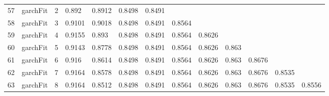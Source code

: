 \documentclass[10pt,a4paper]{article}
\begin{document}
\begin{table}[ht]
\begin{tabular}{rlrllllllllll}
  57 & garchFit &     2 & 0.892 & 0.8912 & 0.8498 & 0.8491 &  &  &  &  &  &  \\ 
  58 & garchFit &     3 & 0.9101 & 0.9018 & 0.8498 & 0.8491 & 0.8564 &  &  &  &  &  \\ 
  59 & garchFit &     4 & 0.9155 & 0.893 & 0.8498 & 0.8491 & 0.8564 & 0.8626 &  &  &  &  \\ 
  60 & garchFit &     5 & 0.9143 & 0.8778 & 0.8498 & 0.8491 & 0.8564 & 0.8626 & 0.863 &  &  &  \\ 
  61 & garchFit &     6 & 0.916 & 0.8614 & 0.8498 & 0.8491 & 0.8564 & 0.8626 & 0.863 & 0.8676 &  &  \\ 
  62 & garchFit &     7 & 0.9164 & 0.8578 & 0.8498 & 0.8491 & 0.8564 & 0.8626 & 0.863 & 0.8676 & 0.8535 &  \\ 
  63 & garchFit &     8 & 0.9164 & 0.8512 & 0.8498 & 0.8491 & 0.8564 & 0.8626 & 0.863 & 0.8676 & 0.8535 & 0.8556 \\ 
   \hline
\end{tabular}
\end{table}
\end{document}
